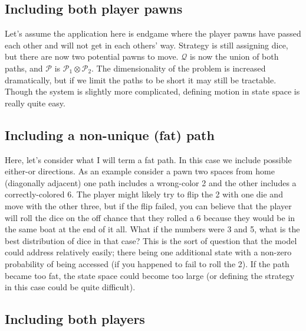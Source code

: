 \documentclass[letterpaper,11pt]{article}
\begin{document}
\subsection{Including both player pawns}
Let's assume the application here is endgame where the player pawns have
passed each other and will not get in each others' way.  Strategy is still
assigning dice, but there are now two potential pawns to move.  $\mathcal{Q}$ 
is now the union of both paths, and $\mathcal{P}$ is $\mathcal{P}_1\otimes
\mathcal{P}_2$.  The dimensionality of the problem is increased dramatically,
but if we limit the paths to be short it may still be tractable.  Though the
system is slightly more complicated, defining motion in state space is really
quite easy.

\subsection{Including a non-unique (fat) path}
Here, let's consider what I will term a fat path.  In this case we include
possible either-or directions.  As an example consider a pawn two spaces from
home (diagonally adjacent) one path includes a wrong-color 2 and the other
includes a correctly-colored 6.  The player might likely try to flip the 2 with
one die and move with the other three, but if the flip failed, you can believe
that the player will roll the dice on the off chance that they rolled a 6
because they would be in the same boat at the end of it all.  What if the
numbers were 3 and 5, what is the best distribution of dice in that case?
This is the sort of question that the model could address relatively easily;
there being one additional state with a non-zero probability of being accessed
(if you happened to fail to roll the 2).  If the path became too fat, the state
space could become too large (or defining the strategy in this case could be
quite difficult).

\subsection{Including both players}
\end{document}
